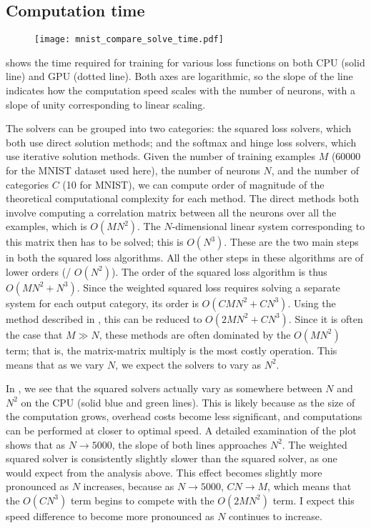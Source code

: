 \subsection{Computation time}

\begin{figure}
  \centering
  \texttt{[image: mnist\_compare\_solve\_time.pdf]}
\end{figure}

 shows the time required for training
for various loss functions on both CPU (solid line) and GPU (dotted line).
Both axes are logarithmic,
so the slope of the line indicates how the computation speed scales
with the number of neurons,
with a slope of unity corresponding to linear scaling.

The solvers can be grouped into two categories:
the squared loss solvers, which both use direct solution methods;
and the softmax and hinge loss solvers, which use iterative solution methods.
Given the number of training examples $M$ (60000 for the MNIST dataset used here),
the number of neurons $N$,
and the number of categories $C$ (10 for MNIST),
we can compute order of magnitude
of the theoretical computational complexity for each method.
The direct methods both involve computing a correlation matrix
between all the neurons over all the examples,
which is $O(MN^2)$.
The $N$-dimensional linear system corresponding to this matrix
then has to be solved; this is $O(N^3)$.
These are the two main steps in both the squared loss algorithms.
All the other steps in these algorithms are of lower orders (\eg/ $O(N^2)$).
The order of the squared loss algorithm is thus $O(MN^2 + N^3)$.
Since the weighted squared loss requires solving
a separate system for each output category,
its order is $O(CMN^2 + CN^3)$.
Using the method described in ,
this can be reduced to $O(2MN^2 + CN^3)$.
Since it is often the case that $M \gg N$,
these methods are often dominated by the $O(MN^2)$ term;
that is, the matrix-matrix multiply is the most costly operation.
This means that as we vary $N$, we expect the solvers to vary as $N^2$.

In ,
we see that the squared solvers actually vary as somewhere
between $N$ and $N^2$ on the CPU (solid blue and green lines).
This is likely because as the size of the computation grows,
overhead costs become less significant,
and computations can be performed at closer to optimal speed.
A detailed examination of the plot shows that as $N \to 5000$,
the slope of both lines approaches $N^2$.
The weighted squared solver is consistently slightly slower
than the squared solver,
as one would expect from the analysis above.
This effect becomes slightly more pronounced as $N$ increases,
because as $N \to 5000$, $CN \to M$,
which means that the $O(CN^3)$ term begins to compete with the $O(2MN^2)$ term.
I expect this speed difference to become more pronounced as $N$ continues to increase.

